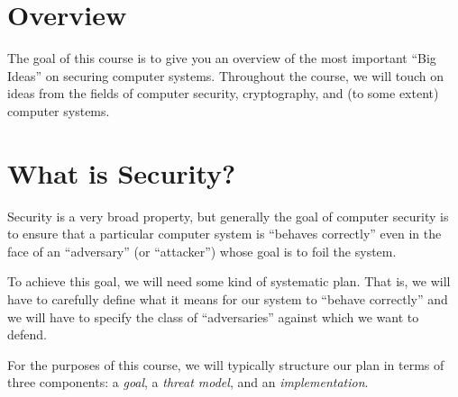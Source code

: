\section{Overview}

The goal of this course is to give you an overview of the 
most important ``Big Ideas'' on securing computer systems.
Throughout the course, we will touch on ideas from the fields
of computer security, cryptography, and (to some extent)
computer systems.

\iffalse
\textbf{Big Idea}: Big ideas for securing computers.
\begin{itemize}
	\item Lectures: ask questions!
	\item Labs (coding) + psets (theory)
	\item Midterm + final
\end{itemize}
\fi

\section{What is Security?}
Security is a very broad property, but generally
the goal of computer security 
is to ensure that a particular computer system is 
``behaves correctly'' even in the
face of an ``adversary'' (or ``attacker'') whose goal is to foil the
system.

To achieve this goal, we will need some kind of
systematic plan.
That is, we will have to carefully define 
what it means for our system to ``behave correctly''
and we will have to specify the class of 
``adversaries'' against which we want to defend.

For the purposes of this course, we will typically
structure our plan in terms of three components:
a \emph{goal}, 
a \emph{threat model}, and
an \emph{implementation}.

